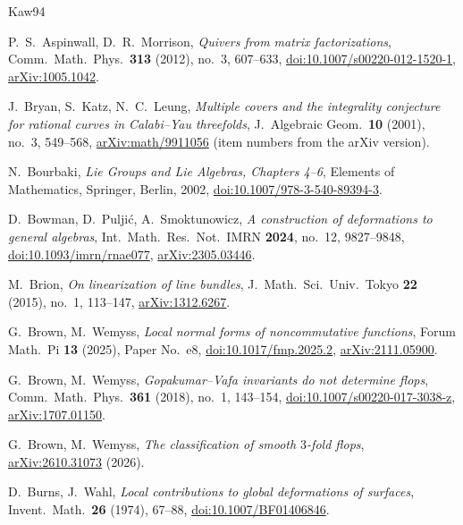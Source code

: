 \documentclass[11pt]{amsart}
\numberwithin{table}{section}
\numberwithin{figure}{section}
\numberwithin{equation}{section}
\theoremstyle{definition}
\theoremstyle{plain}
\begin{document}
%
\begin{thebibliography}{Kaw94}

P.~S.~Aspinwall, D.~R.~Morrison, \emph{Quivers from matrix factorizations}, Comm.\ Math.\ Phys.\ \textbf{313} (2012), no.~3, 607--633, \href{https://doi.org/10.1007/s00220-012-1520-1}{doi:10.1007/s00220-012-1520-1}, \href{https://arxiv.org/abs/1005.1042}{arXiv:1005.1042}.

J.~Bryan, S.~Katz, N.~C.~Leung, \emph{Multiple covers and the integrality conjecture for rational curves in Calabi--Yau threefolds}, J.\ Algebraic Geom.\ \textbf{10} (2001), no.~3, 549--568, \href{https://arxiv.org/abs/math/9911056}{arXiv:math/9911056} (item numbers from the arXiv version).

N.~Bourbaki, \emph{Lie Groups and Lie Algebras, Chapters 4--6}, Elements of Mathematics, Springer, Berlin, 2002, \href{https://doi.org/10.1007/978-3-540-89394-3}{doi:10.1007/978-3-540-89394-3}.

D.~Bowman, D.~Pulji\'c, A.~Smoktunowicz, \emph{A construction of deformations to general algebras}, Int.\ Math.\ Res.\ Not.\ IMRN \textbf{2024}, no.~12, 9827--9848, \href{https://doi.org/10.1093/imrn/rnae077}{doi:10.1093/imrn/rnae077}, \href{https://arxiv.org/abs/2305.03446}{arXiv:2305.03446}.

M.~Brion, \emph{On linearization of line bundles}, J.\ Math.\ Sci.\ Univ.\ Tokyo \textbf{22} (2015), no.~1, 113--147, \href{https://arxiv.org/abs/1312.6267}{arXiv:1312.6267}.

G.~Brown, M.~Wemyss, \emph{Local normal forms of noncommutative functions}, Forum Math.\ Pi \textbf{13} (2025), Paper No.~e8, \href{https://doi.org/10.1017/fmp.2025.2}{doi:10.1017/fmp.2025.2}, \href{https://arxiv.org/abs/2111.05900}{arXiv:2111.05900}.

G.~Brown, M.~Wemyss, \emph{Gopakumar--Vafa invariants do not determine flops}, Comm.\ Math.\ Phys.\ \textbf{361} (2018), no.~1, 143--154, \href{https://doi.org/10.1007/s00220-017-3038-z}{doi:10.1007/s00220-017-3038-z}, \href{https://arxiv.org/abs/1707.01150}{arXiv:1707.01150}.

G.~Brown, M.~Wemyss, \emph{The classification of smooth $3$-fold flops}, \href{https://arxiv.org/abs/2610.31073}{arXiv:2610.31073} (2026).

D.~Burns, J.~Wahl, \emph{Local contributions to global deformations of surfaces}, Invent.\ Math.\ \textbf{26} (1974), 67--88, \href{https://doi.org/10.1007/BF01406846}{doi:10.1007/BF01406846}.


\end{thebibliography}
\end{document}
